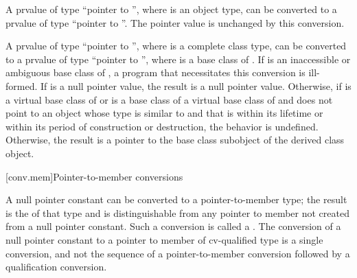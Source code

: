 \pnum
A prvalue of type ``pointer to \cv{} '', where 
is an object type, can be converted to a prvalue of type ``pointer to
\cv{} ''.
The pointer value is unchanged by this conversion.

\pnum
A prvalue  of type ``pointer to \cv{} '', where 
is a complete class type, can be converted to a prvalue of type ``pointer to
\cv{} '', where  is a base class
of . If  is an
inaccessible or
ambiguous base class of , a program
that necessitates this conversion is ill-formed.
If  is a null pointer value,
the result is a null pointer value.
Otherwise,
if  is a virtual base class of 
or is a base class of a virtual base class of  and
 does not point to an object
whose type is similar to  and
that is
within its lifetime or
within its period of construction or destruction,
the behavior is undefined.
%
%
%
%
%
Otherwise,
the result is a pointer to the base class subobject of
the derived class object.

[conv.mem]{Pointer-to-member conversions}

\pnum
{}%
%
%
A null pointer constant can be converted to a
pointer-to-member
type; the result is the 
of that type and is distinguishable from any pointer to member not
created from a null pointer constant.
Such a conversion is called a .
The conversion of a null pointer
constant to a pointer to member of cv-qualified type is a single
conversion, and not the sequence of a pointer-to-member conversion
followed by a qualification conversion.

